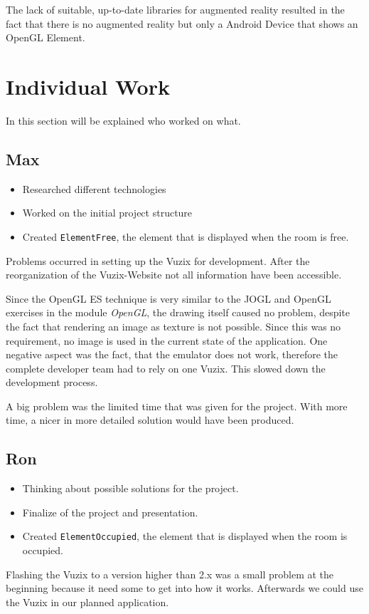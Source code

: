 \documentclass[11pt]{scrartcl}
\begin{document}
\begin{multicols}{2}
		The lack of suitable, up-to-date libraries for augmented reality resulted in the fact that there is no augmented reality but only a Android Device that shows an OpenGL Element.  

	\section{Individual Work}
		In this section will be explained who worked on what.
		\subsection{Max}
			\begin{itemize}
				\item Researched different technologies
				\item Worked on the initial project structure
				\item Created \texttt{ElementFree}, the element that is displayed when the room is free.
			\end{itemize}
			 Problems occurred in setting up the Vuzix for development. After the reorganization of the Vuzix-Website not all information have been accessible.
			 
			 Since the OpenGL ES technique is very similar to the JOGL and OpenGL exercises in the module \emph{OpenGL}, the drawing itself caused no problem, despite the fact that rendering an image as texture is not possible. Since this was no requirement, no image is used in the current state of the application.  One negative aspect was the fact, that the emulator does not work, therefore the complete developer team had to rely on one Vuzix. This slowed down the development process.
			 
			 A big problem was the limited time that was given for the project.  With more time, a nicer in more detailed solution would have been produced.
		\subsection{Ron}
			\begin{itemize}
				\item Thinking about possible solutions for the project.
				\item Finalize of the project and presentation.
				\item Created \texttt{ElementOccupied}, the element that is displayed when the room is occupied.
			\end{itemize}
			Flashing the Vuzix to a version higher than 2.x was a small problem at the beginning because it need some to get into how it works. Afterwards we could use the Vuzix in our planned application.
			

\end{multicols}
\end{document}
